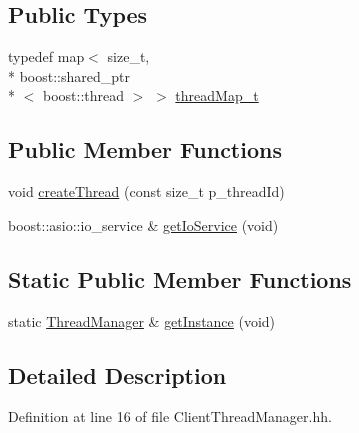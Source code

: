 \subsection*{Public Types}
\begin{DoxyCompactItemize}
\item 
typedef map$<$ size\-\_\-t, \\*
boost\-::shared\-\_\-ptr\\*
$<$ boost\-::thread $>$ $>$ \hyperlink{classxtd_1_1network_1_1base_1_1ThreadManager_a589ebd86682829a8dc09475c24d303c7}{thread\-Map\-\_\-t}
\end{DoxyCompactItemize}
\subsection*{Public Member Functions}
\begin{DoxyCompactItemize}
\item 
void \hyperlink{classxtd_1_1network_1_1base_1_1ThreadManager_a8401b77963df643d6ca29e5abd7da9ba}{create\-Thread} (const size\-\_\-t p\-\_\-thread\-Id)
\item 
boost\-::asio\-::io\-\_\-service \& \hyperlink{classxtd_1_1network_1_1base_1_1ThreadManager_afe3f6bc402d13a07cad5fc8d09473739}{get\-Io\-Service} (void)
\end{DoxyCompactItemize}
\subsection*{Static Public Member Functions}
\begin{DoxyCompactItemize}
\item 
static \hyperlink{classxtd_1_1network_1_1base_1_1ThreadManager}{Thread\-Manager} \& \hyperlink{classxtd_1_1network_1_1base_1_1ThreadManager_a987b37b09ba82f07f870f4720561c958}{get\-Instance} (void)
\end{DoxyCompactItemize}


\subsection{Detailed Description}


Definition at line 16 of file Client\-Thread\-Manager.\-hh.



